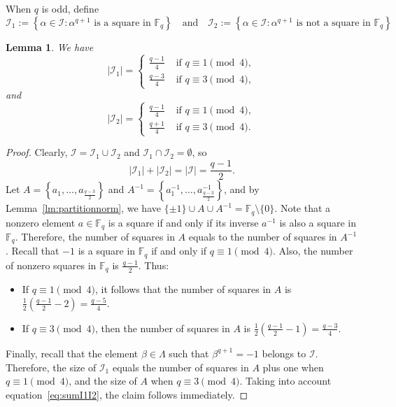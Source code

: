 \documentclass[11pt]{article}
\newtheorem{lemma}[theorem]{Lemma}
\theoremstyle{definition}
\numberwithin{equation}{section}
\def\cI{\mathcal I}
\def\F{{\mathbb F}}
\begin{document}
When $q$ is odd, define
\[\cI_1:=\left\{\alpha \in \cI \colon \alpha^{q+1} \mbox{ is a square in } \F_q\right\} \ \ \  \mbox{ and } \ \ \ \cI_2:=\left\{\alpha \in \cI \colon \alpha^{q+1} \mbox{ is not a square in }\F_q\right\}\]

\begin{lemma} We have 
\[\lvert 
\cI_1 \rvert= 
\begin{cases}
 \frac{q-1}{4} & \mbox{ if }q \equiv 1 \pmod{4}, \\ 
 \frac{q-3}{4} & \mbox{ if } q \equiv 3 \pmod{4}, 
 \end{cases}\] and  
 \[\lvert \cI_2 \rvert= 
 \begin{cases} 
 \frac{q-1}{4} & \mbox{ if } q \equiv 1 \pmod{4}, \\  
 \frac{q+1}{4} & \mbox{ if } q \equiv 3 \pmod{4}. 
 \end{cases}\] 
 \end{lemma}

\begin{proof}
    Clearly, $\mathcal{I} = \mathcal{I}_1 \cup \mathcal{I}_2$ and $\mathcal{I}_1 \cap \mathcal{I}_2 = \emptyset$, so \begin{equation} \label{eq:sumI1I2}
        \lvert \cI_1\rvert+\lvert \cI_2\rvert=\lvert \cI \rvert=\frac{q-1}{2}.\end{equation}
    Let $A = \left\{a_1, \ldots, a_{\frac{q-3}{2}}\right\}$ and $A^{-1} = \left\{a_1^{-1}, \ldots, a_{\frac{q-3}{2}}^{-1}\right\}$, and by Lemma~\ref{lm:partitionnorm}, we have $\{\pm 1\} \cup A \cup A^{-1} = \F_q \setminus \{0\}$. 
Note that a nonzero element $a \in \mathbb{F}_q$ is a square if and only if its inverse $a^{-1}$ is also a square in $\mathbb{F}_q$. Therefore, the number of squares in $A$ equals to the number of squares in $A^{-1}$. Recall that $-1$ is a square in $\mathbb{F}_q$ if and only if $q \equiv 1 \pmod{4}$. Also, the number of nonzero squares in $\mathbb{F}_q$ is $\frac{q-1}{2}$. Thus: 
\begin{itemize}
    \item If $q \equiv 1 \pmod{4}$, it follows that the number of squares in $A$ is $\frac{1}{2} \left( \frac{q-1}{2} - 2 \right) = \frac{q-5}{4}$.

\item If $q \equiv 3 \pmod{4}$, then the number of squares in $A$ is $\frac{1}{2} \left( \frac{q-1}{2} - 1 \right) = \frac{q-3}{4}$.
\end{itemize}
Finally, recall that the element $\beta \in \Lambda$ such that $\beta^{q+1} = -1$ belongs to $\mathcal{I}$. Therefore, the size of $\mathcal{I}_1$ equals the number of squares in $A$ plus one when $q \equiv 1 \pmod{4}$, and the size of $A$ when $q \equiv 3 \pmod{4}$. Taking into account equation~\eqref{eq:sumI1I2}, the claim follows immediately.
\end{proof}
\end{document}
